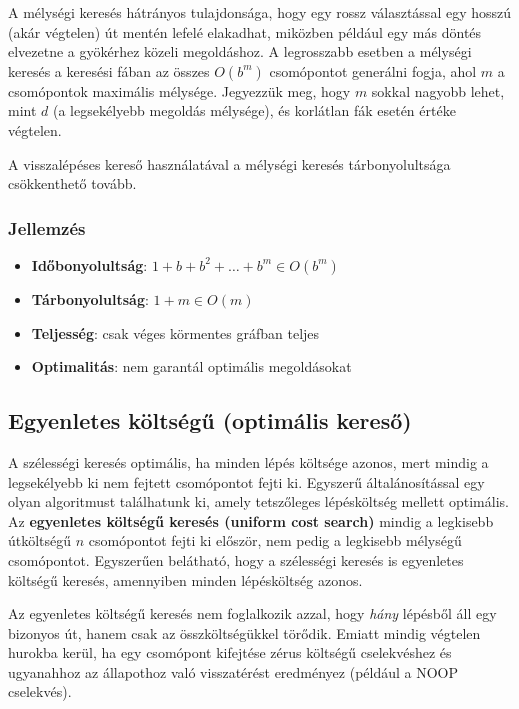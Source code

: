 A mélységi keresés hátrányos tulajdonsága, hogy egy rossz választással egy
hosszú (akár végtelen) út mentén lefelé elakadhat, miközben például egy más
döntés elvezetne a gyökérhez közeli megoldáshoz. A legrosszabb esetben a
mélységi keresés a keresési fában az összes $O(b^m)$ csomópontot generálni fogja,
ahol $m$ a csomópontok maximális mélysége. Jegyezzük meg, hogy $m$ sokkal nagyobb
lehet, mint $d$ (a legsekélyebb megoldás mélysége), és korlátlan fák esetén
értéke végtelen.

\begin{megjegyzes}
    A visszalépéses kereső használatával a mélységi keresés tárbonyolultsága
    csökkenthető tovább.
\end{megjegyzes}

\subsubsection{Jellemzés}

\begin{itemize}
    \item {\bf Időbonyolultság}: $1 + b + b^2 + \ldots + b^m \in O(b^m)$
    \item {\bf Tárbonyolultság}: $1 + m \in O(m)$
    \item {\bf Teljesség}: csak véges körmentes gráfban teljes
    \item {\bf Optimalitás}: nem garantál optimális megoldásokat
\end{itemize}

\subsection{Egyenletes költségű (optimális kereső)}

A szélességi keresés optimális, ha minden lépés költsége azonos, mert mindig a
legsekélyebb ki nem fejtett csomópontot fejti ki. Egyszerű általánosítással egy
olyan algoritmust találhatunk ki, amely tetszőleges lépésköltség mellett
optimális. Az {\bf egyenletes költségű keresés (uniform cost search)} mindig a
legkisebb útköltségű $n$ csomópontot fejti ki először, nem pedig a legkisebb
mélységű csomópontot. Egyszerűen belátható, hogy a szélességi keresés is
egyenletes költségű keresés, amennyiben minden lépésköltség azonos.

Az egyenletes költségű keresés nem foglalkozik azzal, hogy {\it hány} lépésből
áll egy bizonyos út, hanem csak az összköltségükkel törődik. Emiatt mindig
végtelen hurokba kerül, ha egy csomópont kifejtése zérus költségű cselekvéshez
és ugyanahhoz az állapothoz való visszatérést eredményez (például a NOOP
cselekvés).

